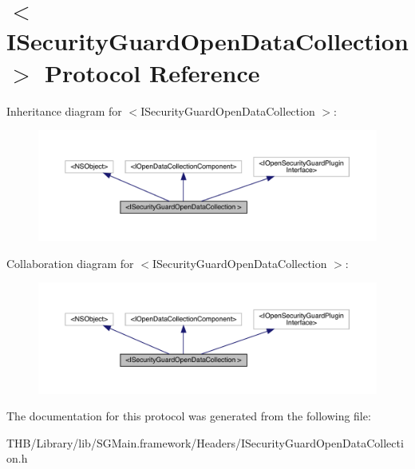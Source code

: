 \hypertarget{protocol_i_security_guard_open_data_collection_01-p}{}\section{$<$I\+Security\+Guard\+Open\+Data\+Collection $>$ Protocol Reference}
\label{protocol_i_security_guard_open_data_collection_01-p}


Inheritance diagram for $<$I\+Security\+Guard\+Open\+Data\+Collection $>$\+:\nopagebreak
\begin{figure}[H]
\begin{center}
\leavevmode
\includegraphics[width=350pt]{protocol_i_security_guard_open_data_collection_01-p__inherit__graph}
\end{center}
\end{figure}


Collaboration diagram for $<$I\+Security\+Guard\+Open\+Data\+Collection $>$\+:\nopagebreak
\begin{figure}[H]
\begin{center}
\leavevmode
\includegraphics[width=350pt]{protocol_i_security_guard_open_data_collection_01-p__coll__graph}
\end{center}
\end{figure}


The documentation for this protocol was generated from the following file\+:\begin{DoxyCompactItemize}
\item 
T\+H\+B/\+Library/lib/\+S\+G\+Main.\+framework/\+Headers/I\+Security\+Guard\+Open\+Data\+Collection.\+h\end{DoxyCompactItemize}
